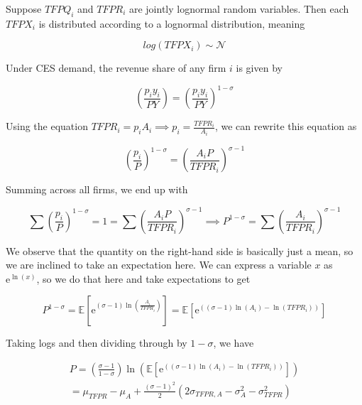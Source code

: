 \documentclass[12pt, letterpaper]{article}
\newcommand{\e}{\mathrm{e}}
\newcommand{\Ex}[1]{\mathbb{E}\left[#1\right]}
\begin{document}
    Suppose \(TFPQ_i\) and \(TFPR_i\) are jointly lognormal random variables. Then each \(TFPX_i\) is distributed according to a lognormal distribution, meaning 

    \[ log(TFPX_i) \sim \mathcal{N}   \]




    Under CES demand, the revenue share of any firm \(i\) is given by 
    
    \[\left(\frac{p_i y_i}{P Y}\right) = \left(\frac{p_i y_i}{P Y}\right)^{1 - \sigma} \]

    Using the equation \(TFPR_i = p_i A_i \implies p_i = \frac{TFPR_i}{A_i}\), we can rewrite this equation as

    \[\left(\frac{p_i}{P}\right)^{1 - \sigma} = \left(\frac{A_i P}{TFPR_i}\right)^{\sigma - 1} \]

    Summing across all firms, we end up with

    \[ \sum \left(\frac{p_i}{P}\right)^{1 - \sigma} = 1 = \sum \left(\frac{A_i P}{TFPR_i}\right)^{\sigma - 1} \implies P^{1 - \sigma} = \sum \left(\frac{A_i}{TFPR_i}\right)^{\sigma - 1}    \]

    We observe that the quantity on the right-hand side is basically just a mean, so we are inclined to take an expectation here. We can express a variable \(x\) as \(\e^{\ln(x)}\), so we do that here and take expectations to get

    \[ P^{1 - \sigma} = \Ex{\e^{(\sigma - 1) \ln(\frac{A_i}{TFPR_i})}} = \Ex{\e^{\left((\sigma - 1) \ln(A_i) - \ln(TFPR_i)\right)}}     \]

    Taking logs and then dividing through by \(1 - \sigma\), we have

    \begin{align*}
    P = \left(\frac{\sigma - 1}{1 - \sigma}\right) \ln(\Ex{\e^{\left((\sigma - 1) \ln(A_i) - \ln(TFPR_i)\right)}}) \\ = \mu_{TFPR} - \mu_A + \frac{(\sigma - 1)^2}{2} \left( 2 \sigma_{TFPR, A} - \sigma_A^2 - \sigma_{TFPR}^2 \right)
    \end{align*}
\end{document}
